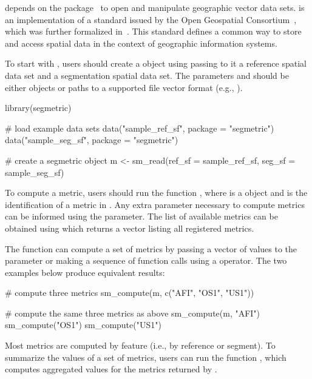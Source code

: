  depends on the  package~\citep{Pebesma2018} to open and manipulate geographic vector data sets.
 is an implementation of a standard issued by the Open Geospatial Consortium~\citep{OGC2011}, which was further formalized in~\citet{ISO2004}. 
This standard defines a common way to store and access spatial data in the context of geographic information systems.

To start with , users should create a  object using  passing to it a reference spatial data set and a segmentation spatial data set. The parameters  and  should be either  objects or paths to a supported file vector format (e.g., ). 

\begin{example}
library(segmetric)

# load example data sets
data("sample_ref_sf", package = "segmetric")
data("sample_seg_sf", package = "segmetric")

# create a segmetric object
m <- sm_read(ref_sf = sample_ref_sf, seg_sf = sample_seg_sf)
\end{example}

To compute a metric, users should run the function , where  is a  object and  is the identification of a metric in . Any extra parameter necessary to compute metrics can be informed using the  parameter. The list of available metrics can be obtained using  which returns a  vector listing all registered metrics.

The  function can compute a set of metrics by passing a vector of values to the  parameter or making a sequence of function calls using a  operator. The two examples below produce equivalent results:

\begin{example}
# compute three metrics
sm_compute(m, c("AFI", "OS1", "US1"))

# compute the same three metrics as above
sm_compute(m, "AFI") %
  sm_compute("OS1") %
  sm_compute("US1")
\end{example}

Most metrics are computed by feature (i.e., by reference or segment). To summarize the values of a set of metrics, users can run the function , which computes aggregated values for the metrics returned by .

